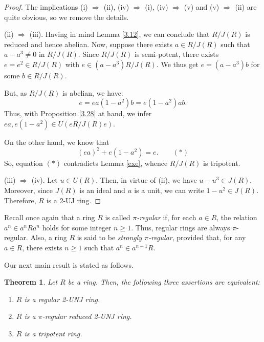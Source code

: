\documentclass[12pt]{amsart}
\newtheorem{theorem}{Theorem}[section]
\theoremstyle{definition}
\begin{document}
\begin{proof}
The implications (i) $\Rightarrow$ (ii), (iv) $\Rightarrow$ (i), (iv) $\Rightarrow$ (v) and (v) $\Rightarrow$ (ii) are quite obvious, so we remove the details.
	
(ii) $\Rightarrow$ (iii). Having in mind Lemma \ref{3.12}, we can conclude that $R/J(R)$ is reduced and hence abelian. Now, suppose there exists $a \in R/J(R)$ such that $a-a^3 \neq 0$ in $R/J(R)$. Since $R/J(R)$ is semi-potent, there exists $e=e^2 \in R/J(R)$ with $e \in (a-a^3)R/J(R)$. We thus get $e=(a-a^3)b$ for some $b \in R/J(R)$.
	
But, as $R/J(R)$ is abelian, we have:
\begin{equation*}
		e = ea(1-a^2)b = e(1-a^2)ab.
\end{equation*}
Thus, with Proposition \ref{3.28} at hand, we infer $ea, e(1-a^2) \in U(eR/J(R)e)$. 

On the other hand, we know that
\begin{equation*}
		(ea)^2 + e(1-a^2) = e. \qquad (*)
\end{equation*}
So, equation $\left( \ast \right)$ contradicts Lemma \ref{exe}, whence $R/J(R)$ is tripotent.
	
(iii) $\Rightarrow$ (iv). Let $u \in U(R)$. Then, in virtue of (ii), we have $u-u^3 \in J(R)$. Moreover, since $J(R)$ is an ideal and $u$ is a unit, we can write $1-u^2 \in J(R)$. Therefore, $R$ is a 2-UJ ring.
\end{proof}

Recall once again that a ring $R$ is called {\it $\pi$-regular} if, for each $a\in R$, the relation $a^n\in a^nRa^n$ holds for some integer $n\ge1$. Thus, regular rings are always $\pi$-regular. Also, a ring $R$ is said to be {\it strongly $\pi$-regular}, provided that, for any $a\in R$, there exists $n\ge 1$ such that $a^n\in a^{n+1}R$.

\medskip

Our next main result is stated as follows.

\begin{theorem}\label{3.13}
Let \(R\) be a ring. Then, the following three assertions are equivalent:
\begin{enumerate}
\item
\(R\) is a regular 2-UNJ ring.
\item
\(R\) is a \(\pi\)-regular reduced 2-UNJ ring.
\item
\(R\) is a tripotent ring.
\end{enumerate}
\end{theorem}
\end{document}
